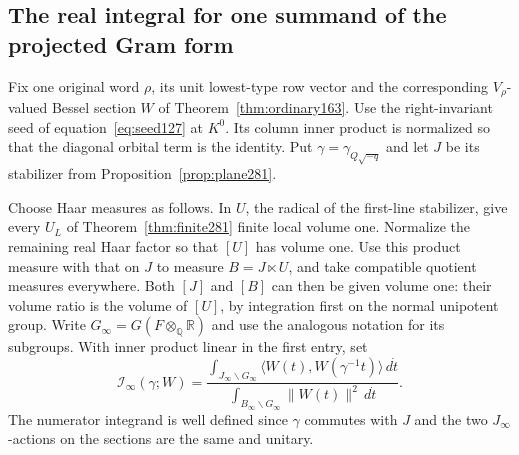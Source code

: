 \documentclass[a4paper,11pt]{article}
\theoremstyle{definition}
\theoremstyle{remark}
\newcommand{\RR}{\mathbb R}\newcommand{\CC}{\mathbb C}\newcommand{\QQ}{\mathbb Q}
\numberwithin{equation}{section}
\begin{document}
\subsection{The real integral for one summand of the projected Gram form}\label{nav:VII-50}
Fix one original word \(\rho\), its unit lowest-type row vector
and the corresponding \(V_\rho\)-valued Bessel section \(W\)
of Theorem~\ref{thm:ordinary163}. Use the right-invariant seed
of equation~\eqref{eq:seed127} at \(K^0\). Its column
inner product is normalized so that the diagonal orbital
term is the identity. Put \(\gamma=\gamma_{Q\sqrt{-q}}\)
and let \(J\) be its stabilizer from
Proposition~\ref{prop:plane281}.

Choose Haar measures as follows. In \(U\), the radical of the
first-line stabilizer, give every \(U_L\) of
Theorem~\ref{thm:finite281} finite local volume one.
Normalize the remaining real Haar factor so that \([U]\)
has volume one. Use this product measure with that on \(J\)
to measure \(B=J\ltimes U\), and take compatible quotient
measures everywhere. Both \([J]\) and \([B]\) can then be
given volume one: their volume ratio is the volume of
\([U]\), by integration first on the normal unipotent group.
Write \(G_\infty=G(F\otimes_\QQ\RR)\) and use the analogous
notation for its subgroups. With inner product linear in
the first entry, set
\[
 \mathcal I_\infty(\gamma;W)=
 \frac{\displaystyle\int_{J_\infty\backslash G_\infty}
       \langle W(t),W(\gamma^{-1}t)\rangle\,d\dot t}
      {\displaystyle\int_{B_\infty\backslash G_\infty}
                     \|W(t)\|^2\,d\dot t}.
\]
The numerator integrand is well defined since \(\gamma\)
commutes with \(J\) and the two \(J_\infty\)-actions on the
sections are the same and unitary.
\end{document}
